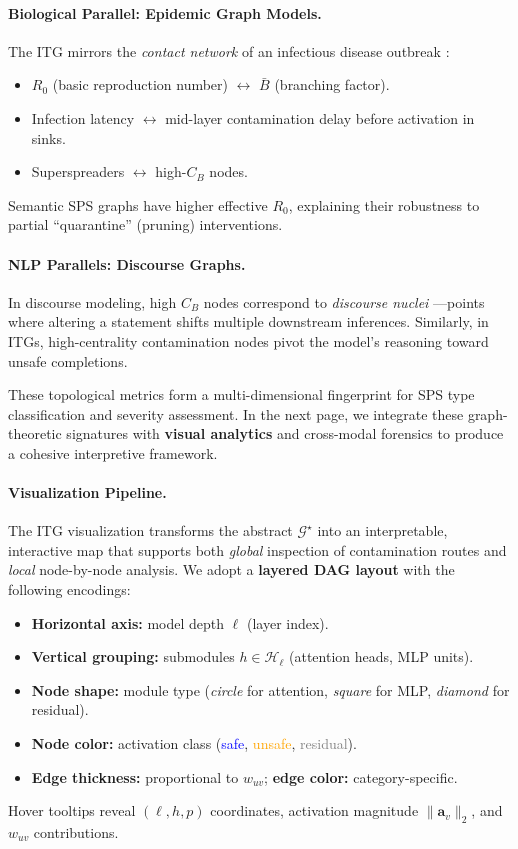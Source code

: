 \documentclass[11pt]{article}
\begin{document}
\paragraph{Biological Parallel: Epidemic Graph Models.}
The ITG mirrors the \emph{contact network} of an infectious disease outbreak \citep{pastor2015epidemic}: 
\begin{itemize}
    \item $R_0$ (basic reproduction number) $\leftrightarrow$ $\bar{B}$ (branching factor).
    \item Infection latency $\leftrightarrow$ mid-layer contamination delay before activation in sinks.
    \item Superspreaders $\leftrightarrow$ high-$C_B$ nodes.
\end{itemize}
Semantic SPS graphs have higher effective $R_0$, explaining their robustness to partial “quarantine” (pruning) interventions.

\paragraph{NLP Parallels: Discourse Graphs.}
In discourse modeling, high $C_B$ nodes correspond to \emph{discourse nuclei} \citep{mann1988rhetorical}—points where altering a statement shifts multiple downstream inferences.  
Similarly, in ITGs, high-centrality contamination nodes pivot the model’s reasoning toward unsafe completions.

\bigskip
These topological metrics form a multi-dimensional fingerprint for SPS type classification and severity assessment.  
In the next page, we integrate these graph-theoretic signatures with \textbf{visual analytics} and cross-modal forensics to produce a cohesive interpretive framework.



\paragraph{Visualization Pipeline.}
The ITG visualization transforms the abstract $\mathcal{G}^\star$ into an interpretable, interactive map that supports both \textit{global} inspection of contamination routes and \textit{local} node-by-node analysis.  
We adopt a \textbf{layered DAG layout} with the following encodings:
\begin{itemize}
    \item \textbf{Horizontal axis:} model depth $\ell$ (layer index).
    \item \textbf{Vertical grouping:} submodules $h \in \mathcal{H}_\ell$ (attention heads, MLP units).
    \item \textbf{Node shape:} module type (\textit{circle} for attention, \textit{square} for MLP, \textit{diamond} for residual).
    \item \textbf{Node color:} activation class (\textcolor{blue}{safe}, \textcolor{orange}{unsafe}, \textcolor{gray}{residual}).
    \item \textbf{Edge thickness:} proportional to $w_{uv}$; \textbf{edge color:} category-specific.
\end{itemize}
Hover tooltips reveal $(\ell,h,p)$ coordinates, activation magnitude $\|\mathbf{a}_v\|_2$, and $w_{uv}$ contributions.
\end{document}
